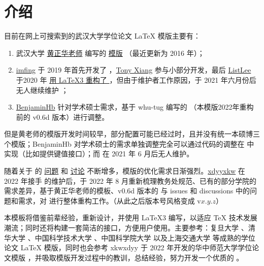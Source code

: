 
\section{介绍}

目前在网上可搜索到的武汉大学学位论文 \LaTeX{} 模版主要有：

\begin{enumerate}
  \item 武汉大学 \href{http://aff.whu.edu.cn/huangzh/}{黄正华老师} 编写的 \href{http://aff.whu.edu.cn/huangzh/#:~:text=%E4%B8%8B%E5%88%97-,%E6%AF%95%E4%B8%9A%E8%AE%BA%E6%96%87%E6%A8%A1%E6%9D%BF,-%2C%20%E9%80%82%E7%94%A8%E4%BA%8E%20TeX}{模版} （最近更新为 2016 年）；
  \item \href{https://github.com/imfing}{imfing} 于 2019 年首先开发了 ，\href{https://github.com/T0nyX1ang}{Tony Xiang} 参与小部分开发，最后 \href{https://github.com/tanukihee}{ListLee} 于2020 年 \href{https://github.com/whutug/whu-thesis/commit/d488438b7819ddf5a128081a50b118d8fd4ec1ef}{用 \LaTeX3 重构了 }，但由于维护者工作原因，于 2021 年六月份后无人继续维护 ；
  \item \href{https://github.com/BenjaminHb/whu-thesis}{BenjaminHb} 针对学术硕士需求，基于 whu-tug 编写的 \href{https://github.com/whutug/whu-thesis}{} （本模版2022年重构前的 v0.6d 版本）进行调整。
\end{enumerate}

但是黄老师的模版开发时间较早，部分配置可能已经过时，且并没有统一本硕博三个模版；BenjaminHb 对学术硕士的需求单独调整完全可以通过代码的调整在  中实现（比如提供键值接口）；而  在 2021 年 6 月后无人维护。

随着关于  的 \href{https://github.com/whutug/whu-thesis/issues}{问题} 和 \href{https://github.com/whutug/whu-thesis/discussions}{讨论} 不断增多，模版的优化需求日渐强烈。\href{https://github.com/xkwxdyy}{xdyyxkw} 在 2022 年接手  的维护后，于 2022 年 8 月重新梳理教务处规范、已有的部分学院的需求差异，基于黄正华老师的模板、v0.6d 版本的  与 issues 和 discussions 中的问题和需求，对  进行整体重构工作。（从此之后版本号风格变成 v$x.y.z$）

本模板将借鉴前辈经验，重新设计，并使用 \LaTeX3 编写，以适应 \TeX{} 技术发展潮流；同时还将构建一套简洁的接口，方便用户使用。主要参考：复旦大学 、清华大学 、中国科学技术大学 、中国科学院大学  以及上海交通大学  等成熟的学位论文 \LaTeX{} 模版，同时也会参考 xkwxdyy 于 2022 年开发的华中师范大学学位论文模版 ，并吸取模版开发过程中的教训，总结经验，努力开发一个优质的 。
